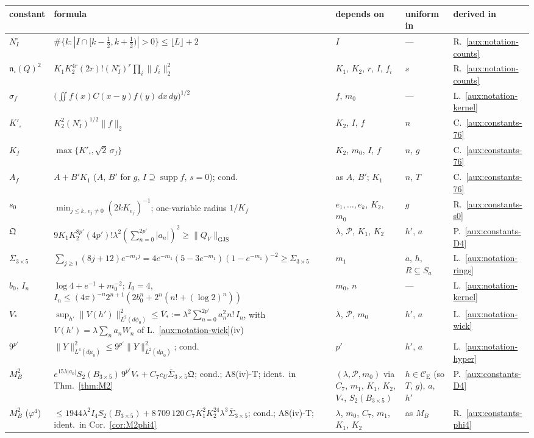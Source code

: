 \documentclass[11pt,a4paper]{article}
\theoremstyle{plain}
\theoremstyle{definition}
\theoremstyle{plain}
\theoremstyle{definition}
\newcommand{\CE}{\mathcal{C}_{\mathrm E}}
\DeclareMathOperator{\supp}{supp}
\newcommand{\GJS}[1]{\lVert #1\rVert_{\mathrm{GJS}}}   %
\newcommand{\dmu}{d\mu_0}
\newcommand{\dphi}{d\phi_0}
\begin{document}
\begin{center}
\footnotesize
\begin{tabular}{@{}p{}p{}p{}p{}p{}@{}}
\toprule
constant & formula & depends on & uniform in & derived in\\
\midrule
$N^{\square}_I$ & $\#\{k:|I\cap[k-\frac12,k+\frac12)|>0\}\le\lfloor L\rfloor+2$ & $I$ & --- &
R.~\ref{aux:notation-counts}\\
$\mathfrak n_\square(Q)^2$ & $K_1K_2^{4r}(2r)!(N^{\square}_I)^r\prod_i\|f_i\|_2^2$ &
$K_1$, $K_2$, $r$, $I$, $f_i$ & $s$ & R.~\ref{aux:notation-counts}\\
$\sigma_f$ & $\bigl(\iint f(x)C(x-y)f(y)\,dx\,dy\bigr)^{1/2}$ & $f$, $m_0$ & --- &
L.~\ref{aux:notation-kernel}\\
$K'_\square$ & $K_2^2(N^{\square}_I)^{1/2}\|f\|_2$ & $K_2$, $I$, $f$ & $n$ & C.~\ref{aux:constants-76}\\
$K_f$ & $\max\{K'_\square,\sqrt2\,\sigma_f\}$ & $K_2$, $m_0$, $I$, $f$ & $n$, $g$ &
C.~\ref{aux:constants-76}\\
$A_f$ & $A+B'K_1$ ($A$, $B'$ for $g$, $I\supseteq\supp f$, $s=0$); cond. & as $A$, $B'$;
$K_1$ & $n$, $T$ & C.~\ref{aux:constants-76}\\
$s_0$ & $\min_{j\le k,\,e_j\ne0}(2kK_{e_j})^{-1}$; one-variable radius $1/K_f$ & $e_1,\dots,e_k$,
$K_2$, $m_0$ & $g$ & R.~\ref{aux:constants-s0}\\
$\mathfrak Q$ & $9K_1K_2^{8p'}(4p')!\lambda^2(\sum_{n=0}^{2p'}|a_n|)^2\ge\GJS{Q_V}$ &
$\lambda$, $\mathscr P$, $K_1$, $K_2$ & $h'$, $a$ & P.~\ref{aux:constants-D4}\\
$\overline\Sigma_{3\times5}$ & $\sum_{j\ge1}(8j+12)e^{-m_1j}=4e^{-m_1}(5-3e^{-m_1})
(1-e^{-m_1})^{-2}\ge\Sigma_{3\times5}$ & $m_1$ & $a$, $h$, $R\subseteq S_a$ &
L.~\ref{aux:notation-rings}\\
$b_0$, $I_n$ & $\log4+e^{-1}+m_0^{-2}$; $I_0=4$,
$I_n\le(4\pi)^{-n}2^{n+1}(2b_0^n+2^n(n!+(\log2)^n))$ & $m_0$, $n$ & --- &
L.~\ref{aux:notation-kernel}\\
$V_*$ & $\sup_{h'}\|V(h')\|^2_{L^2(\dphi)}\le\overline V_*:=\lambda^2\sum_{n=0}^{2p'}a_n^2n!\,I_n$,
with $V(h')=\lambda\sum_na_nW_n$ of L.~\ref{aux:notation-wick}(iv)
& $\lambda$, $\mathscr P$, $m_0$ & $h'$, $a$ & L.~\ref{aux:notation-wick}\\
$9^{p'}$ & $\|Y\|_{L^4(\dmu)}^2\le9^{p'}\|Y\|_{L^2(\dmu)}^2$; cond. & $p'$ & $h'$, $a$ &
L.~\ref{aux:notation-hyper}\\
$M_B^2$ & $e^{15\lambda|a_0|}S_2(B_{3\times5})\,9^{p'}V_*+C_7c_U\overline\Sigma_{3\times5}\mathfrak Q$;
cond.; A8(iv)-T; ident.\ in Thm.~\ref{thm:M2} & $(\lambda,\mathscr P,m_0)$ via $C_7$, $m_1$, $K_1$, $K_2$, $V_*$, $S_2(B_{3\times5})$ &
$h\in\CE$ (so $T$, $g$), $a$, $h'$ & P.~\ref{aux:constants-D4}\\
$M_B^2$ ($\varphi^4$) & $\le1944\lambda^2I_4S_2(B_{3\times5})+8\,709\,120\,C_7K_1^2K_2^{24}
\lambda^3\overline\Sigma_{3\times5}$; cond.; A8(iv)-T; ident.\ in Cor.~\ref{cor:M2phi4} & $\lambda$, $m_0$, $C_7$, $m_1$, $K_1$, $K_2$ & as $M_B$ &
R.~\ref{aux:constants-phi4}\\
\bottomrule
\end{tabular}
\end{center}
\end{document}
